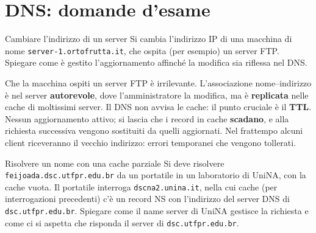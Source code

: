\section{DNS: domande d'esame}

\begin{esercizio}{Cambiare l'indirizzo di un server}
Si cambia l'indirizzo IP di una macchina di nome \texttt{server-1.ortofrutta.it}, che ospita (per esempio) un server FTP.
Spiegare come è gestito l'aggiornamento affinché la modifica sia riflessa nel DNS.
\end{esercizio}

\svolgimento
Che la macchina ospiti un server FTP è irrilevante. L'associazione nome--indirizzo è nel server \textbf{autorevole}, dove
l'amministratore la modifica, ma è \textbf{replicata} nelle cache di moltissimi server. Il DNS non avvisa le cache: il punto
cruciale è il \textbf{TTL}. Nessun aggiornamento attivo; si lascia che i record in cache \textbf{scadano}, e alla richiesta
successiva vengono sostituiti da quelli aggiornati. Nel frattempo alcuni client riceveranno il vecchio indirizzo: errori
temporanei che vengono tollerati.


\begin{esercizio}{Risolvere un nome con una cache parziale}
Si deve risolvere \texttt{feijoada.dsc.utfpr.edu.br} da un portatile in un laboratorio di UniNA, con la cache vuota. Il portatile
interroga \texttt{dscna2.unina.it}, nella cui cache (per interrogazioni precedenti) c'è un record NS con l'indirizzo del server
DNS di \texttt{dsc.utfpr.edu.br}. Spiegare come il name server di UniNA gestisce la richiesta e come ci si aspetta che
risponda il server di \texttt{dsc.utfpr.edu.br}.
\end{esercizio}

